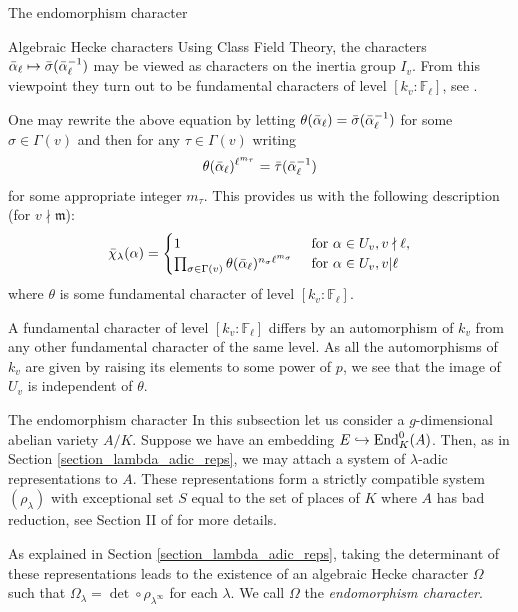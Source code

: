 \documentclass[11pt,a4paper]{article}
\newcommand{\Fl}{\mathbb{F}_\ell}
\newcommand{\m}{\mathfrak{m}}
\begin{document}
\begin{section}{The endomorphism character}
\begin{subsection}{Algebraic Hecke characters}
Using Class Field Theory, the characters $\Bar{\alpha}_\ell \mapsto \Bar{\sigma}(\Bar{\alpha}_\ell^{-1})$ may be viewed as characters on the inertia group $I_v$. From this viewpoint they turn out to be fundamental characters of level $[k_v:\Fl]$, see \cite[Prop 3]{Serre72}.

One may rewrite the above equation by letting $\theta(\Bar{\alpha}_\ell) = \Bar{\sigma}(\Bar{\alpha}_\ell^{-1})$ for some $\sigma \in \Gamma(v)$ and then for any $\tau \in \Gamma(v)$ writing $$\theta(\Bar{\alpha}_\ell)^{\ell^{m_\tau}} = \Bar{\tau}(\Bar{\alpha}_\ell^{-1})$$ for some appropriate integer $m_\tau$. This provides us with the following description (for $v \nmid \m$):
\begin{equation}
 \label{eqn_endo_Char_inertia}
\Bar{\chi}_\lambda(\alpha) = 
\begin{cases} 
1 & \text{ for } \alpha \in U_v, v\nmid \ell,\\ 
\prod_{\sigma \in \Gamma(v)} \theta(\Bar{\alpha}_\ell)^{n_\sigma \ell^{m_\sigma}}  & \text{ for } \alpha \in U_v, v | \ell
\end{cases}
\end{equation}
where $\theta$ is some fundamental character of level $[k_v:\Fl]$.

A fundamental character of level $[k_v:\Fl]$ differs by an automorphism of $k_v$ from any other fundamental character of the same level.
As all the automorphisms of $k_v$ are given by raising its elements to some power of $p$, we see that the image of $U_v$ is independent of $\theta$.
\end{subsection}
\begin{subsection}{The endomorphism character}
\label{subsection_endo_char}
In this subsection let us consider a $g$-dimensional abelian variety $A/K$. Suppose we have an embedding $E \hookrightarrow \End^0_K(A)$.
Then, as in Section \ref{section_lambda_adic_reps}, we may attach a system of $\lambda$-adic representations to $A$. 
These representations form a strictly compatible system $(\rho_\lambda)$ with exceptional set $S$ equal to the set of places of $K$ where $A$ has bad reduction, see Section II of \cite{ribet_RM} for more details.

As explained in Section \ref{section_lambda_adic_reps}, taking the determinant of these representations leads to the existence of an algebraic Hecke character $\Omega$ such that $\Omega_\lambda = \det \circ \rho_{\lambda^\infty}$ for each $\lambda$.
We call $\Omega$ the \emph{endomorphism character}.


\end{subsection}
\end{section}
\end{document}
